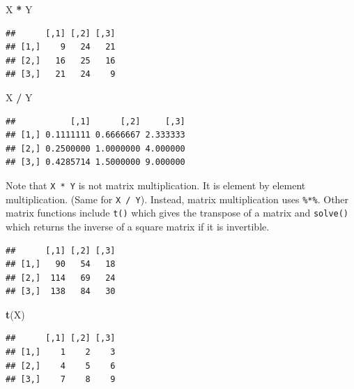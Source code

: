 \documentclass[]{book}
\newenvironment{Shaded}{\begin{snugshade}}{\end{snugshade}}
\newcommand{\KeywordTok}[1]{\textcolor[rgb]{0.13,0.29,0.53}{\textbf{#1}}}
\newcommand{\StringTok}[1]{\textcolor[rgb]{0.31,0.60,0.02}{#1}}
\newcommand{\OperatorTok}[1]{\textcolor[rgb]{0.81,0.36,0.00}{\textbf{#1}}}
\newcommand{\NormalTok}[1]{#1}
\theoremstyle{definition}
\theoremstyle{definition}
\theoremstyle{definition}
\theoremstyle{remark}
\begin{document}
\begin{Shaded}
\begin{Highlighting}[]
\NormalTok{X }\OperatorTok{*}\StringTok{ }\NormalTok{Y}
\end{Highlighting}
\end{Shaded}

\begin{verbatim}
##      [,1] [,2] [,3]
## [1,]    9   24   21
## [2,]   16   25   16
## [3,]   21   24    9
\end{verbatim}

\begin{Shaded}
\begin{Highlighting}[]
\NormalTok{X }\OperatorTok{/}\StringTok{ }\NormalTok{Y}
\end{Highlighting}
\end{Shaded}

\begin{verbatim}
##           [,1]      [,2]     [,3]
## [1,] 0.1111111 0.6666667 2.333333
## [2,] 0.2500000 1.0000000 4.000000
## [3,] 0.4285714 1.5000000 9.000000
\end{verbatim}

Note that \texttt{X\ *\ Y} is not matrix multiplication. It is element
by element multiplication. (Same for \texttt{X\ /\ Y}). Instead, matrix
multiplication uses \texttt{\%*\%}. Other matrix functions include
\texttt{t()} which gives the transpose of a matrix and \texttt{solve()}
which returns the inverse of a square matrix if it is invertible.

\begin{Shaded}
\end{Shaded}

\begin{verbatim}
##      [,1] [,2] [,3]
## [1,]   90   54   18
## [2,]  114   69   24
## [3,]  138   84   30
\end{verbatim}

\begin{Shaded}
\begin{Highlighting}[]
\KeywordTok{t}\NormalTok{(X)}
\end{Highlighting}
\end{Shaded}

\begin{verbatim}
##      [,1] [,2] [,3]
## [1,]    1    2    3
## [2,]    4    5    6
## [3,]    7    8    9
\end{verbatim}
\end{document}
